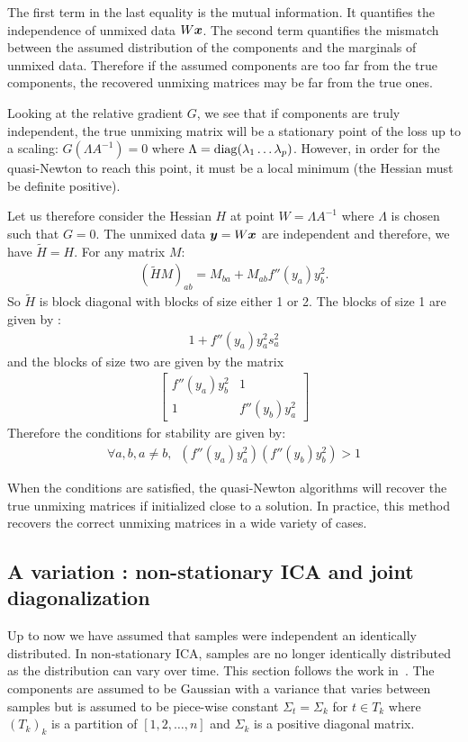 The first term in the last equality is the mutual information. It quantifies the
independence of unmixed data $W \boldsymbol{x}$. The second term quantifies the mismatch
between the assumed distribution of the components and the marginals of unmixed data.
Therefore if the assumed components are too far from the true components, the
recovered unmixing matrices may be far from the true ones.


Looking at the relative gradient $G$, we see that if components are truly
independent, the true unmixing matrix will be a stationary point of the loss up
to a scaling: $G(\Lambda A^{-1})=0$ where $\Lambda=\operatorname*{diag}(\lambda_1 \dots \lambda_p)$.
However, in order for the quasi-Newton to reach this point, it must be a local
minimum (the Hessian must be definite positive). 

Let us therefore consider the Hessian $H$ at point $W = \Lambda A^{-1}$ where
$\Lambda$ is chosen such that $G = 0$. The unmixed data $\boldsymbol{y} = W \boldsymbol{x}$ are independent and
therefore, we have $\tilde{H} = H$.
For any matrix $M$:
\begin{align}(\tilde{H} M)_{ab} = M_{ba} + M_{ab} f''(y_a)y_b^2.
\end{align}
So $\tilde{H}$ is block diagonal with blocks of size either 1 or 2.
The blocks of size 1 are given by :
\begin{align}
  1 + f''(y_a) y_a^2
  s_a^2
\end{align}
and the blocks of size
two are given by the matrix
\begin{align}
                              \begin{bmatrix} f''(y_a) y_b^2
  & 1 \\ 1 &
  f''(y_b)y_a^2 \end{bmatrix}
\end{align}
Therefore the conditions for stability are given by:
\begin{align}
  \forall a, b, a \neq b, \enspace \left(f''(y_a) y_a^2 \right) \left(f''(y_b)  y_b^2 \right) > 1
\end{align}

When the conditions are satisfied, the quasi-Newton algorithms will recover the
true unmixing matrices if initialized close to a solution. In practice, this
method recovers the correct unmixing matrices in a wide variety of cases.

\subsection{A variation : non-stationary ICA and joint diagonalization}
Up to now we have assumed that samples were independent an identically distributed. In non-stationary ICA, samples are no longer identically distributed as the distribution can vary over time.
This section follows the work in~\cite{pham2001blind}.
The components are assumed to be Gaussian with a variance that varies between
samples but is assumed to be piece-wise constant $\Sigma_t = \Sigma_k$ for $t \in
T_k$ where $(T_k)_k$ is a partition of $[1, 2, \dots, n]$ and $\Sigma_k$ is a
positive diagonal matrix.

